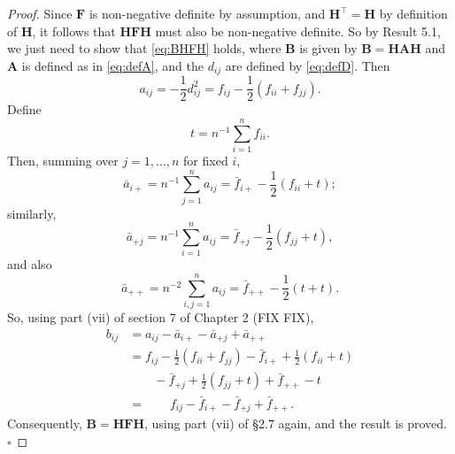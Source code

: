 \documentclass[]{book}
\theoremstyle{definition}
\theoremstyle{definition}
\theoremstyle{definition}
\theoremstyle{remark}
\begin{document}
\begin{proof}
{}Since \(\boldsymbol F\) is non-negative definite by assumption, and \(\boldsymbol H^\top =\boldsymbol H\) by definition of \(\boldsymbol H\), it follows that \(\boldsymbol H\boldsymbol F\boldsymbol H\) must also be non-negative definite. So by Result 5.1, we just need to show that \eqref{eq:BHFH} holds, where \(\boldsymbol B\) is given by \(\boldsymbol B=\boldsymbol H\boldsymbol A\boldsymbol H\) and \(\boldsymbol A\) is defined as in \eqref{eq:defA}, and the \(d_{ij}\) are defined by \eqref{eq:defD}. Then
\[
a_{ij}=-\frac{1}{2}d_{ij}^2 =f_{ij}-\frac{1}{2}(f_{ii}+f_{jj}).
\]
Define
\[
t=n^{-1}\sum_{i=1}^n f_{ii}.
\]
Then, summing over \(j=1, \ldots , n\) for fixed \(i\),
\[
\bar{a}_{i+}=n^{-1}\sum_{j=1}^n a_{ij} = \bar{f}_{i+}-\frac{1}{2}(f_{ii}+t);
\]
similarly,
\[
\bar{a}_{+j}=n^{-1}\sum_{i=1}^n a_{ij}=\bar{f}_{+j}-\frac{1}{2}(f_{jj}+t),
\]
and also
\[
\bar{a}_{++}=n^{-2}\sum_{i,j=1}^n a_{ij}=\bar{f}_{++}-\frac{1}{2}(t+t).
\]
So, using part (vii) of section 7 of Chapter 2 (FIX FIX),
\begin{align*} 
b_{ij}&=a_{ij}-\bar{a}_{i+}-\bar{a}_{+j}+\bar{a}_{++}\\
&=f_{ij}-\frac{1}{2}(f_{ii}+f_{jj})-\bar{f}_{i+}+\frac{1}{2}(f_{ii}+t)\\
& \qquad -\bar{f}_{+j}+\frac{1}{2}(f_{jj}+t) +\bar{f}_{++}-t\\
& =\qquad f_{ij}-\bar{f}_{i+}-\bar{f}_{+j}+\bar{f}_{++}.
\end{align*}
Consequently, \(\boldsymbol B=\boldsymbol H\boldsymbol F\boldsymbol H\), using part (vii) of \S 2.7 again, and the result is proved.
\hfill\(\square\)
\end{proof}


\end{document}
